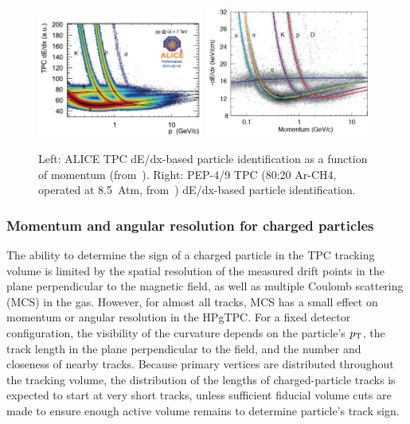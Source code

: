 \begin{figure}[htb]
\centering 
\includegraphics[width=0.49\textwidth]{graphics/ALICE_TPC_dEdx_Lippmann_2012.png}
\includegraphics[width=0.49\textwidth]{graphics/PEP4-TPC-80Ar-20CH4-8_5atm_dEdx.png} 
\caption{Left: ALICE TPC dE/dx-based particle identification as a function of momentum (from~\cite{ALICE_Lippmann}). Right: PEP-4/9 TPC (80:20 Ar-CH4, operated at 8.5~Atm, from~\cite{Grupen:1999by}) dE/dx-based particle identification.} 
\label{fig:ALICE_dEdx} 
\end{figure}

\subsubsection{Momentum and angular resolution for charged particles}
%
The ability to determine the sign of a charged particle in the TPC tracking volume is limited by the spatial resolution of the measured drift points in the plane perpendicular to the magnetic field, as well as multiple Coulomb scattering (MCS) in the gas. However, for almost all tracks, MCS has a small effect on momentum or angular resolution in the HPgTPC. For a fixed detector configuration, the visibility of the curvature depends on the particle's $p_{\rm{T}}$, the track length in the plane perpendicular to the field, and the number and closeness of nearby tracks.  Because primary vertices are distributed throughout the tracking volume, the distribution of the lengths of charged-particle tracks is expected to start at very short tracks, unless sufficient fiducial volume cuts are made to ensure enough active volume remains to determine particle's track sign.

